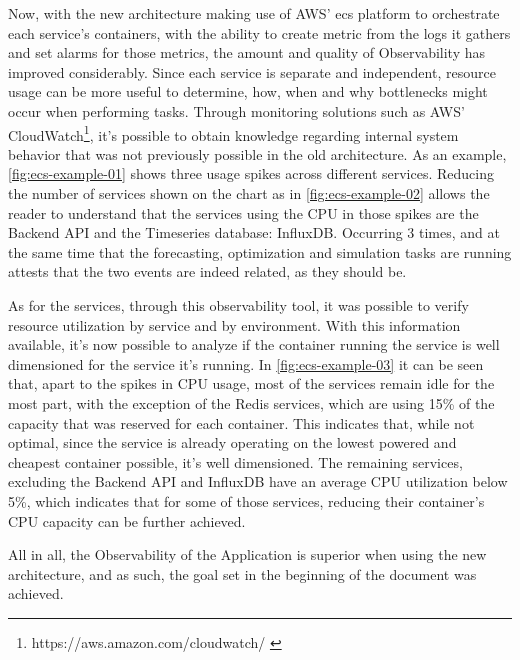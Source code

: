 Now, with the new architecture making use of AWS' \gls{ecs} platform to orchestrate each service's containers, with the ability to create metric from the logs it gathers and set alarms for those metrics, the amount and quality of Observability has improved considerably. Since each service is separate and independent, resource usage can be more useful to determine, how, when and why bottlenecks might occur when performing tasks.
Through monitoring solutions such as AWS' CloudWatch\footnote{https://aws.amazon.com/cloudwatch/ \label{foot:cloudwatch}}, it's possible to obtain knowledge regarding internal system behavior that was not previously possible in the old architecture.
As an example, \cref{fig:ecs-example-01} shows three usage spikes across different services. Reducing the number of services shown on the chart as in \cref{fig:ecs-example-02} allows the reader to understand that the services using the CPU in those spikes are the Backend API and the Timeseries database: InfluxDB.
Occurring 3 times, and at the same time that the forecasting, optimization and simulation tasks are running attests that the two events are indeed related, as they should be.

As for the services, through this observability tool, it was possible to verify resource utilization by service and by environment. With this information available, it's now possible to analyze if the container running the service is well dimensioned for the service it's running. In \cref{fig:ecs-example-03} it can be seen that, apart to the spikes in CPU usage, most of the services remain idle for the most part, with the exception of the Redis services, which are using 15\% of the capacity that was reserved for each container. This indicates that, while not optimal, since the service is already operating on the lowest powered and cheapest container possible, it's well dimensioned. The remaining services, excluding the Backend API and InfluxDB have an average CPU utilization below 5\%, which indicates that for some of those services, reducing their container's CPU capacity can be further achieved.




 

 

All in all, the Observability of the Application is superior when using the new architecture, and as such, the goal set in the beginning of the document was achieved.